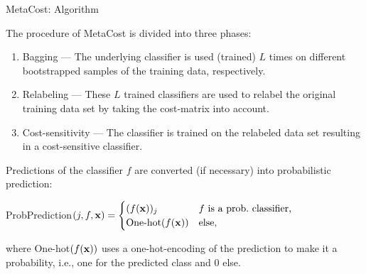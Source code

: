 \documentclass[11pt,compress,t,notes=noshow, xcolor=table]{beamer}
\begin{document}
\begin{vbframe}{MetaCost: Algorithm}
	
	\scriptsize{
%		
 	The procedure of MetaCost is divided into three phases:
		\begin{minipage}{0.53\textwidth} 
%				
				\begin{enumerate}
%					
					\scriptsize
					\item Bagging --- The underlying classifier is used (trained) $L$ times on different bootstrapped samples of the training data, respectively.
%					
					\item Relabeling --- These $L$ trained classifiers are used to relabel the original training data set by taking the cost-matrix into account.
%					
					\item Cost-sensitivity ---  The classifier is trained on the relabeled data set resulting in a cost-sensitive classifier.
%					
				\end{enumerate}
%
	\scriptsize
	\lz 
			Predictions of the classifier $f$ are converted (if necessary) into probabilistic prediction:
			\begin{center}
				\tiny
							ProbPrediction$(j,f,\mathbf{x}) = \begin{cases}
					(f(\mathbf{x}))_j & \mbox{$f$ is a prob.\ classifier,} \\
					\mbox{One-hot$(f(\mathbf{x}))$}& \mbox{else,}
				\end{cases}$
			\end{center}
%		
		\scriptsize
		where One-hot$(f(\mathbf{x}))$ uses a one-hot-encoding of the prediction to make it a probability, i.e., one for the predicted class and 0 else. 
		\end{minipage}
		\begin{minipage}{0.45\textwidth} 
			\begin{algorithmic}
				

\end{algorithmic}
\end{minipage}}
\end{vbframe}
\end{document}
